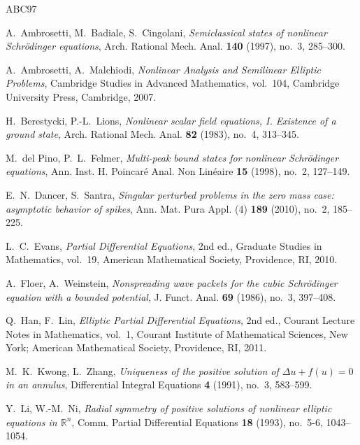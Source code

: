\documentclass[12pt]{amsart}
\theoremstyle{plain}
\theoremstyle{definition}
\theoremstyle{remark}
\begin{document}
\begin{thebibliography}{ABC97}

A.~Ambrosetti, M.~Badiale, S.~Cingolani,
\textit{Semiclassical states of nonlinear Schr\"odinger equations},
Arch. Rational Mech. Anal. \textbf{140} (1997), no.~3, 285--300.



A.~Ambrosetti, A.~Malchiodi,
\textit{Nonlinear Analysis and Semilinear Elliptic Problems},
Cambridge Studies in Advanced Mathematics, vol.~104,
Cambridge University Press, Cambridge, 2007.

H.~Berestycki, P.-L.~Lions,
\textit{Nonlinear scalar field equations, I. Existence of a ground state},
Arch. Rational Mech. Anal. \textbf{82} (1983), no.~4, 313--345.

M.~del Pino, P.~L.~Felmer,
\textit{Multi-peak bound states for nonlinear Schr\"odinger equations},
Ann. Inst. H. Poincar\'e Anal. Non Lin\'eaire \textbf{15} (1998),
no.~2, 127--149.

E.~N.~Dancer, S.~Santra,
\textit{Singular perturbed problems in the zero mass case: asymptotic behavior of spikes},
Ann. Mat. Pura Appl. (4) \textbf{189} (2010), no.~2, 185--225.

L.~C.~Evans,
\textit{Partial Differential Equations},
2nd ed., Graduate Studies in Mathematics, vol.~19,
American Mathematical Society, Providence, RI, 2010.

A.~Floer, A.~Weinstein,
\textit{Nonspreading wave packets for the cubic Schr\"{o}dinger equation with a bounded potential},
J. Funct. Anal. \textbf{69} (1986), no.~3, 397--408.

Q.~Han, F.~Lin,
\textit{Elliptic Partial Differential Equations},
2nd ed., Courant Lecture Notes in Mathematics, vol.~1,
Courant Institute of Mathematical Sciences, New York;
American Mathematical Society, Providence, RI, 2011.

M.~K.~Kwong, L.~Zhang,
\textit{Uniqueness of the positive solution of $\Delta u + f(u) = 0$ in an annulus},
Differential Integral Equations \textbf{4} (1991), no.~3, 583--599.

Y.~Li, W.-M.~Ni,
\textit{Radial symmetry of positive solutions of nonlinear elliptic equations in $\mathbb{R}^{n}$},
Comm. Partial Differential Equations \textbf{18} (1993), no.~5-6, 1043--1054.


\end{thebibliography}
\end{document}
